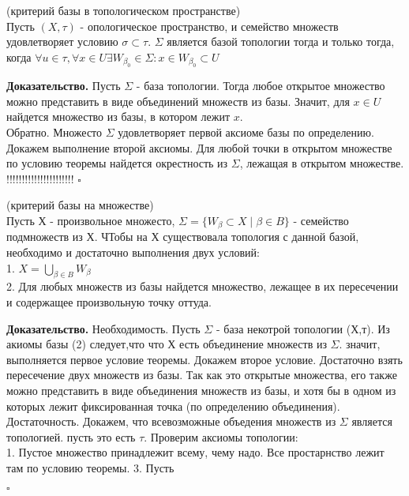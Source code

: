 \begin{theor}
    (критерий базы в топологическом пространстве)\\
    Пусть $(X,\tau)$ - опологическое пространство, и семейство множеств 
    удовлетворяет условию $\sigma\subset \tau$. $\Sigma$ является базой 
    топологии тогда и только тогда, когда 
    $\forall u\in\tau,\forall x\in U\exists W_{\beta_0}\in\Sigma:
    x\in W_{\beta_0}\subset U$
\end{theor}
\textbf{Доказательство.} Пусть $\Sigma$ - база топологии. Тогда любое открытое 
множество можно представить в виде объединений множеств из базы. Значит, для
$x\in U$ найдется множество из базы, в котором лежит $x$.  \\
Обратно. Множесто $\Sigma$ удовлетворяет первой аксиоме базы по определению.
Докажем выполнение второй аксиомы. Для любой точки в открытом множестве
по условию теоремы найдется окрестность из $\Sigma$, лежащая в открытом
множестве. 
!!!!!!!!!!!!!!!!!!!!!!
$\square$ 

\begin{theor}
    (критерий базы на множестве)\\
    Пусть Х - произвольное множесто, $\Sigma=\{W_\beta\subset X\mid\beta
    \in B\}$ - семейство подмножеств из Х. ЧТобы на Х существовала
    топология с данной базой, необходимо и достаточно выполнения
    двух условий:\\
    1. $X=\bigcup\limits_{\beta\in B} W_\beta$\\
    2. Для любых множеств из базы найдется множество, лежащее в их
    пересечении и содержащее произвольную точку оттуда.

\end{theor}
\textbf{Доказательство.} Необходимость. Пусть $\Sigma$ - база некотрой 
топологии (Х,т). Из акиомы базы (2) следует,что что Х есть объединение
множеств из $\Sigma$. значит, выполняется первое условие теоремы. Докажем второе 
условие. Достаточно взять пересечение двух множеств из базы. Так как 
это открытые множества, его также можно представить в виде объединения
множеств из базы, и хотя бы в одном из которых лежит фиксированная точка
(по определению объединения).\\
Достаточность. Докажем, что всевозможные объедения множеств из $\Sigma$  
является топологией. пусть это есть $\tau$. Проверим аксиомы топологии:\\
1.  Пустое множество принадлежит всему, чему надо. Все простарнство 
лежит там по условию теоремы.
3. Пусть 


$\square$ 


